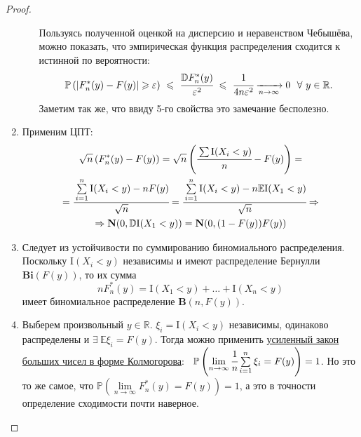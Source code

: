 \begin{proof}
\begin{enumerate}
\begin{enumerate}[label={\arabic*)}]
        \begin{rmrk}
        Пользуясь полученной оценкой на дисперсию и неравенством Чебышёва, можно показать, что эмпирическая функция распределения сходится к истинной по вероятности:
        $$ \mathbb{P}\left(|F_n^*(y) - F(y)| \geqslant \varepsilon \right) ~\leqslant~ \cfrac{\mathbb{D}F_n^*(y)}{\varepsilon^2} ~\leqslant~ \cfrac{1}{4n\varepsilon^2} \xrightarrow[n \to \infty]{} 0 ~~\forall~y \in \mathbb{R}.
        $$
        Заметим так же, что ввиду 5-го свойства это замечание бесполезно.
        \end{rmrk}
    \end{enumerate}
    \item Применим ЦПТ:
    \begin{multline*}
        \sqrt{n}\left(F_{n}^{*}(y)-F(y)\right)
        = \sqrt{n}\left(\cfrac{\sum \mathrm{I}(X_{i}<y)}{n}-F(y)\right) 
        = \\
        = \cfrac{\sum\limits_{i=1}^{n} \mathrm{I}(X_{i}<y)-n F(y)}{\sqrt{n}} 
        = \cfrac{\sum\limits_{i=1}^{n} \mathrm{I}(X_{i}<y)-n \mathbb{E}\mathrm{I}(X_{1}<y)}{\sqrt{n}} 
        \Rightarrow \\
        \Rightarrow \mathbf{N}(0, \mathbb{D}\mathrm{I}(X_{1}<y))
        = \mathbf{N}(0, (1-F(y))F(y))
    \end{multline*}
    \item Следует из устойчивости по суммированию биномиального распределения. Поскольку $\mathrm{I}\left(X_{i}<y\right)$ независимы и имеют распределение Бернулли $\mathbf{Bi}(F(y))$, то их сумма
    \begin{equation*}
        n F_{n}^{*}(y)=\mathrm{I}\left(X_{1}<y\right)+\ldots+\mathrm{I}\left(X_{n}<y\right)
    \end{equation*}
    имеет биномиальное распределение $\mathbf{B}(n, F(y))$.
    
    \item Выберем произвольный $y \in \mathbb{R}$. $\xi_i = \mathrm{I}(X_i < y)$ независимы, одинаково распределены и $\exists~\mathbb{E} \xi_i = F(y)$. Тогда можно применить \hyperlink{SLLN}{усиленный закон больших чисел в форме Колмогорова}:~ ${\mathbb{P}\left(\lim\limits_{n \to \infty} \cfrac{1}{n} \sum\limits_{i = 1}^{n}\xi_i = F(y)\right) = 1}$. Но это то же самое, что $\mathbb{P}\left({\lim\limits_{n \to \infty} F_n^*(y) = F(y)}\right) = 1$, а это в точности определение сходимости почти наверное.
\end{enumerate}  
\end{proof}

